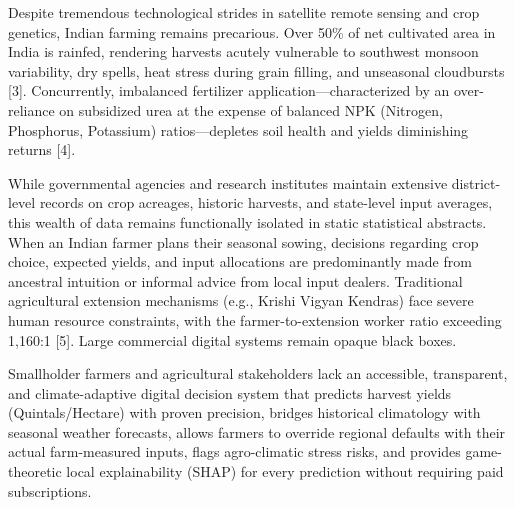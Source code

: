 \documentclass[11pt,a4paper]{report}
\begin{document}
Despite tremendous technological strides in satellite remote sensing and crop genetics, Indian farming remains precarious. Over 50\% of net cultivated area in India is rainfed, rendering harvests acutely vulnerable to southwest monsoon variability, dry spells, heat stress during grain filling, and unseasonal cloudbursts [3]. Concurrently, imbalanced fertilizer application---characterized by an over-reliance on subsidized urea at the expense of balanced NPK (Nitrogen, Phosphorus, Potassium) ratios---depletes soil health and yields diminishing returns [4].

While governmental agencies and research institutes maintain extensive district-level records on crop acreages, historic harvests, and state-level input averages, this wealth of data remains functionally isolated in static statistical abstracts. When an Indian farmer plans their seasonal sowing, decisions regarding crop choice, expected yields, and input allocations are predominantly made from ancestral intuition or informal advice from local input dealers. Traditional agricultural extension mechanisms (e.g., Krishi Vigyan Kendras) face severe human resource constraints, with the farmer-to-extension worker ratio exceeding 1,160:1 [5]. Large commercial digital systems remain opaque black boxes.

\begin{problemstatementbox}
Smallholder farmers and agricultural stakeholders lack an accessible, transparent, and climate-adaptive digital decision system that predicts harvest yields (Quintals/Hectare) with proven precision, bridges historical climatology with seasonal weather forecasts, allows farmers to override regional defaults with their actual farm-measured inputs, flags agro-climatic stress risks, and provides game-theoretic local explainability (SHAP) for every prediction without requiring paid subscriptions.
\end{problemstatementbox}
\end{document}
